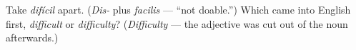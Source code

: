 \begin{tcolorbox}[breakable,colback=teal!4,colframe=teal!35!black,title={Before you move on}]
Take \emph{difícil} apart. (\emph{Dis-} plus \emph{facilis} — \textquotedblleft{}not doable.\textquotedblright{}) Which came into English first, \emph{difficult} or \emph{difficulty}? (\emph{Difficulty} — the adjective was cut out of the noun afterwards.)
\end{tcolorbox}

